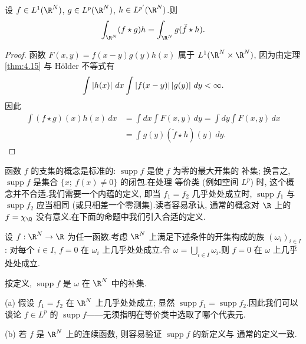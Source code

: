 \begin{proposition}
\label{prop:4.16}
设 $f\in L^1(\R^N)$, $g\in L^p(\R^N)$, $h\in L^{p'}(\R^N)$.则
\begin{equation*}
\int_{\R^N}(f\star g)h=\int_{\R^N}g(\check f\star h).
\end{equation*}
\end{proposition}

\begin{proof}
函数 $F(x,y)=f(x-y)g(y)h(x)$ 属于 $L^1(\R^N\times\R^N)$, 因为由定理
 \ref{thm:4.15} 与 Hölder 不等式有
\begin{equation*}
\int\left|h(x)\right|\,dx\int\left|f(x-y)\right|\left|g(y)\right|\,dy<\infty.
\end{equation*}
因此
\begin{equation*}
\begin{aligned}
\int(f\star g)(x)h(x)\,dx
&=\int dx\int F(x,y)\,dy=\int dy\int F(x,y)\,dx\\
&=\int g(y)(\check f\star h)(y)\,dy.
\end{aligned}
\end{equation*}
\end{proof}

函数 $f$ 的支集的概念是标准的: $\operatorname{supp}f$ 是使 $f$ 为零的最大开集的
补集; 换言之, $\operatorname{supp}f$ 是集合 $\{x;\ f(x)\ne0\}$ 的闭包.在处理
等价类 (例如空间 $L^p$) 时, 这个概念并不合适.我们需要一个内蕴的定义, 即当
$f_1=f_2$ 几乎处处成立时, $\operatorname{supp}f_1$ 与 $\operatorname{supp}f_2$
应当相同 (或只相差一个零测集).读者容易承认, 通常的概念对 $\R$ 上的
$f=\chi_\Q$ 没有意义.在下面的命题中我们引入合适的定义.

\begin{proposition}[以及支集的定义]
\label{prop:4.17}
设 $f:\R^N\to\R$ 为任一函数.考虑 $\R^N$ 上满足下述条件的开集构成的族
$(\omega_i)_{i\in I}$: 对每个 $i\in I$, $f=0$ 在 $\omega_i$ 上几乎处处成立.令
$\omega=\bigcup_{i\in I}\omega_i$.则 $f=0$ 在 $\omega$ 上几乎处处成立.

按定义, $\operatorname{supp}f$ 是 $\omega$ 在 $\R^N$ 中的补集.
\end{proposition}

\begin{remark}
\label{rem:4.9}
(a) 假设 $f_1=f_2$ 在 $\R^N$ 上几乎处处成立; 显然
$\operatorname{supp}f_1=\operatorname{supp}f_2$.因此我们可以谈论 $f\in L^p$ 的
$\operatorname{supp}f$——无须指明在等价类中选取了哪个代表元.

(b) 若 $f$ 是 $\R^N$ 上的连续函数, 则容易验证 $\operatorname{supp}f$ 的新定义与
通常的定义一致.
\end{remark}

